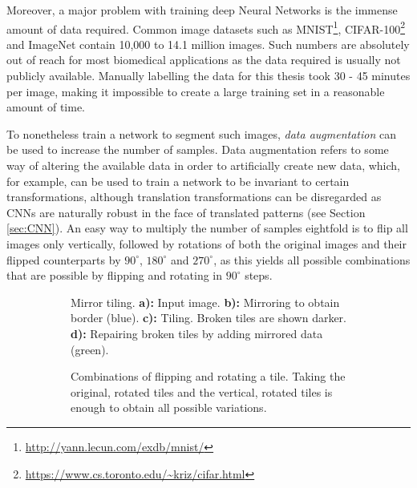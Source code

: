 \noindent Moreover, a major problem with training deep Neural Networks is the immense amount of data required. Common image datasets such as MNIST\footnote{\url{http://yann.lecun.com/exdb/mnist/}}, CIFAR-100\footnote{\url{https://www.cs.toronto.edu/~kriz/cifar.html}} and ImageNet \cite{ILSVRC} contain 10,000 to 14.1 million images. Such numbers are absolutely out of reach for most biomedical applications as the data required is usually not publicly available. Manually labelling the data for this thesis took 30 - 45 minutes per image, making it impossible to create a large training set in a reasonable amount of time.

To nonetheless train a network to segment such images, \textit{data augmentation} can be used to increase the number of samples. Data augmentation refers to some way of altering the available data in order to artificially create new data, which, for example, can be used to train a network to be invariant to certain transformations, although translation transformations can be disregarded as CNNs are naturally robust in the face of translated patterns (see Section \ref{sec:CNN}). An easy way to multiply the number of samples eightfold is to flip all images only vertically, followed by rotations of both the original images and their flipped counterparts by $90^{\circ}$, $180^{\circ}$ and $270^{\circ}$, as this yields all possible combinations that are possible by flipping and rotating in $90^{\circ}$ steps.\\


\begin {figure}[!ht]
	\begin {subfigure}[{position=b}]{0.5\linewidth}
		\scalebox{0.5}{}

		\caption*{Mirror tiling. \textbf{a):} Input image. \textbf{b):} Mirroring to obtain border (blue). \textbf{c):} Tiling. Broken tiles are shown darker. \textbf{d):} Repairing broken tiles by adding mirrored data (green).}
	\end {subfigure}
	\hspace{1cm}
	\begin {subfigure}[{position=b}]{0.5\linewidth}
		\scalebox{0.5}{}

		\caption*{Combinations of flipping and rotating a tile. Taking the original, rotated tiles and the vertical, rotated tiles is enough to obtain all possible variations.}
	\end {subfigure}

		\caption[]{}
		\label{fig:tile_mirror_rotate}

\end {figure}


